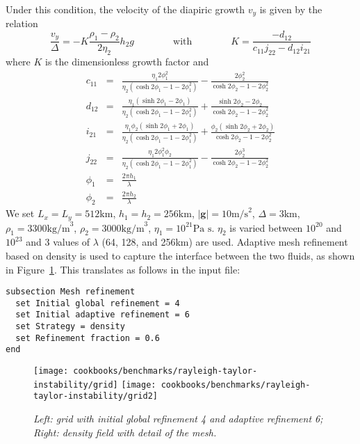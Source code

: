 \documentclass{article}
\begin{document}
Under this condition, the velocity of the diapiric growth
$v_y$ is given by the relation
\begin{equation}
\frac{v_y}{\Delta} = - K \frac{\rho_1-\rho_2}{2 \eta_2} h_2 g
\qquad
\qquad
\text{with}
\qquad
\qquad
K=\frac{-d_{12}}{c_{11}j_{22}-d_{12}i_{21}}
\end{equation}
where $K$ is the dimensionless growth factor and 
\begin{eqnarray}
c_{11} &=& \frac{\eta_1 2 \phi_1^2}{\eta_2(\cosh 2\phi_1 - 1 - 2\phi_1^2)} - \frac{2\phi_2^2}{\cosh 2\phi_2 - 1 - 2 \phi_2^2}\\
d_{12} &=& \frac{\eta_1(\sinh 2\phi_1 -2\phi_1)}{\eta_2(\cosh 2\phi_1 -1 -2\phi_1^2)} + \frac{\sinh 2\phi_2 - 2\phi_2}{\cosh 2\phi_2 -1 -2\phi_2^2} \\
i_{21} &=& \frac{\eta_1\phi_2 (\sinh 2 \phi_1 + 2 \phi_1)}{\eta_2(\cosh 2\phi_1 -1 -2\phi_1^2)} 
+ \frac{\phi_2 (\sinh 2\phi_2 + 2\phi_2)}{\cosh 2\phi_2 -1 -2\phi_2^2} \\
j_{22} &=& \frac{\eta_1 2 \phi_1^2 \phi_2}{\eta_2(\cosh 2\phi_1 -1-2\phi_1^2)} - \frac{2\phi_2^3}{ \cosh 2\phi_2 -1 -2\phi_2^2}\\
\phi_1&=&\frac{2\pi h_1}{\lambda} \\
\phi_2&=&\frac{2\pi h_2}{\lambda}
\end{eqnarray}
We set $L_x=L_y=512\text{km}$, $h_1=h_2=256\text{km}$, $|\boldsymbol{g}|=10\text{m/s}^2$, $\Delta=3\text{km}$, 
$\rho_1=3300\text{kg/m}^3$, $\rho_2=3000\text{kg/m}^3$, $\eta_1=10^{21}\text{Pa s}$. $\eta_2$ is varied between $10^{20}$ and $10^{23}$ 
and 3 values of $\lambda$ (64, 128, and 256km) are used. 
Adaptive mesh refinement based on density is used to capture the interface between the two 
fluids, as shown in Figure~\ref{fig:RTi_grids}. This translates as follows in the input file:
\begin{verbatim}
subsection Mesh refinement
  set Initial global refinement = 4
  set Initial adaptive refinement = 6
  set Strategy = density
  set Refinement fraction = 0.6
end
\end{verbatim}

\begin{figure}
  \centering
  \texttt{[image: cookbooks/benchmarks/rayleigh-taylor-instability/grid]}
  \texttt{[image: cookbooks/benchmarks/rayleigh-taylor-instability/grid2]}
  \caption{\it Left: grid with initial global refinement 4 and adaptive refinement 6; Right: density field with detail of the mesh.} 
  \label{fig:RTi_grids}
\end{figure}
\end{document}
